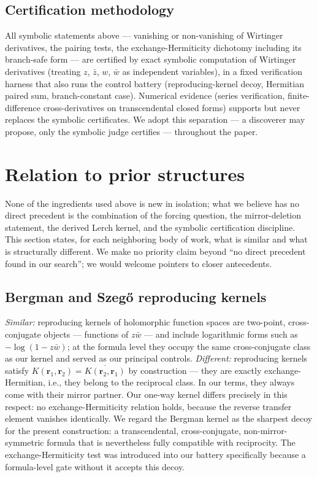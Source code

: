 \documentclass[11pt,a4paper]{article}
\newcommand{\zb}{\bar{z}}
\newcommand{\wb}{\bar{w}}
\begin{document}
\subsection{Certification methodology}

All symbolic statements above --- vanishing or non-vanishing of Wirtinger
derivatives, the pairing tests, the exchange-Hermiticity dichotomy including
its branch-safe form --- are certified by exact symbolic computation of
Wirtinger derivatives (treating $z$, $\zb$, $w$, $\wb$ as independent
variables), in a fixed verification harness that also runs the control battery
(reproducing-kernel decoy, Hermitian paired sum, branch-constant case).
Numerical evidence (series verification, finite-difference cross-derivatives on
transcendental closed forms) supports but never replaces the symbolic
certificates. We adopt this separation --- a discoverer may propose, only the
symbolic judge certifies --- throughout the paper.

\section{Relation to prior structures}
\label{sec:prior}

None of the ingredients used above is new in isolation; what we believe has no
direct precedent is the combination of the forcing question, the mirror-deletion
statement, the derived Lerch kernel, and the symbolic certification discipline.
This section states, for each neighboring body of work, what is similar and what
is structurally different. We make no priority claim beyond ``no direct precedent
found in our search''; we would welcome pointers to closer antecedents.

\subsection{Bergman and Szeg\H{o} reproducing kernels}

\emph{Similar:} reproducing kernels of holomorphic function spaces are two-point,
cross-conjugate objects --- functions of $z\wb$ --- and include logarithmic forms
such as $-\log(1 - z\wb)$; at the formula level they occupy the same
cross-conjugate class as our kernel and served as our principal controls.
\emph{Different:} reproducing kernels satisfy
$K(\mathbf{r}_1, \mathbf{r}_2) = \overline{K(\mathbf{r}_2, \mathbf{r}_1)}$ by
construction --- they are exactly exchange-Hermitian, i.e., they belong to the
reciprocal class. In our terms, they always come with their mirror partner. Our
one-way kernel differs precisely in this respect: no exchange-Hermiticity
relation holds, because the reverse transfer element vanishes identically. We
regard the Bergman kernel as the sharpest decoy for the present construction: a
transcendental, cross-conjugate, non-mirror-symmetric formula that is
nevertheless fully compatible with reciprocity. The exchange-Hermiticity test
was introduced into our battery specifically because a formula-level gate
without it accepts this decoy.
\end{document}
